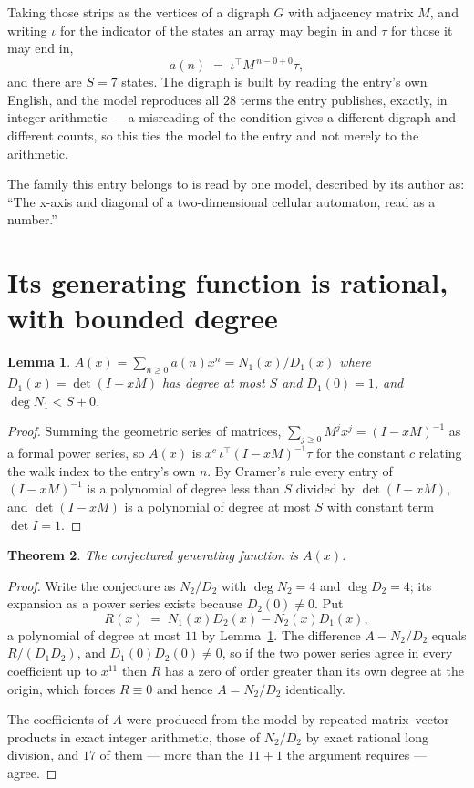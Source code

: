 \documentclass[11pt,a4paper]{article}
\theoremstyle{plain}
\newtheorem{theorem}{Theorem}
\newtheorem{lemma}[theorem]{Lemma}
\theoremstyle{definition}
\begin{document}
Taking those strips as the vertices of a digraph $G$ with adjacency matrix $M$, and writing
$\iota$ for the indicator of the states an array may begin in and $\tau$ for those it may end
in,
\[
a(n)\;=\;\iota^{\!\top}M^{\,n-0+0}\tau ,
\]
and there are $S=7$ states. The digraph is built by reading the entry's own English, and the
model reproduces all $28$ terms the entry publishes, exactly, in integer arithmetic --- a
misreading of the condition gives a different digraph and different counts, so this ties the
model to the entry and not merely to the arithmetic.

The family this entry belongs to is read by one model, described by its author as: ``The x-axis and diagonal of a two-dimensional cellular automaton, read as a number.''


\section{Its generating function is rational, with bounded degree}

\begin{lemma}\label{lem:rat}
$A(x)=\sum_{n\ge0}a(n)x^n=N_1(x)/D_1(x)$ where $D_1(x)=\det(I-xM)$ has degree at most
$S$ and $D_1(0)=1$, and $\deg N_1<S+0$.
\end{lemma}

\begin{proof}
Summing the geometric series of matrices, $\sum_{j\ge0}M^jx^j=(I-xM)^{-1}$ as a formal
power series, so $A(x)$ is $x^{c}\,\iota^{\!\top}(I-xM)^{-1}\tau$ for the constant $c$
relating the walk index to the entry's own $n$. By Cramer's rule every entry of
$(I-xM)^{-1}$ is a polynomial of degree less than $S$ divided by $\det(I-xM)$, and
$\det(I-xM)$ is a polynomial of degree at most $S$ with constant term $\det I=1$.
\end{proof}

\begin{theorem}
The conjectured generating function is $A(x)$.
\end{theorem}

\begin{proof}
Write the conjecture as $N_2/D_2$ with $\deg N_2=4$ and $\deg D_2=4$; its expansion as a
power series exists because $D_2(0)\neq0$. Put
\[
R(x)\;=\;N_1(x)D_2(x)-N_2(x)D_1(x),
\]
a polynomial of degree at most $11$ by Lemma~\ref{lem:rat}. The difference
$A-N_2/D_2$ equals $R/(D_1D_2)$, and $D_1(0)D_2(0)\neq0$, so if the two power series agree in
every coefficient up to $x^{11}$ then $R$ has a zero of order greater than its own
degree at the origin, which forces $R\equiv0$ and hence $A=N_2/D_2$ identically.

The coefficients of $A$ were produced from the model by repeated matrix--vector products in
exact integer arithmetic, those of $N_2/D_2$ by exact rational long division, and $17$
of them --- more than the $11+1$ the argument requires --- agree.
\end{proof}
\end{document}
